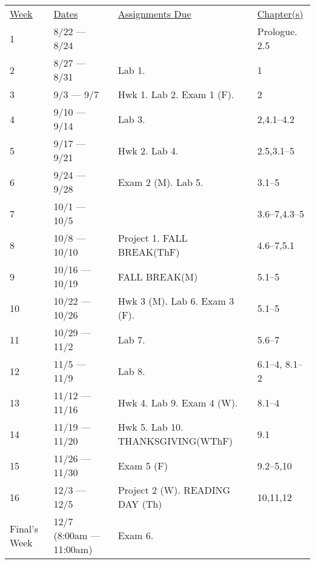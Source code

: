 \documentclass[10pt]{article}
\begin{document}
\begin{center}
\begin{tabular}{llll}
\underline{Week} & \underline{Dates} & \underline{Assignments Due} & \underline{Chapter(s)}\\
1 & 8/22 --- 8/24 &  &  Prologue. 2.5\\
2 & 8/27 --- 8/31 & Lab 1. &  1 \\
3 & 9/3 --- 9/7 & Hwk 1. Lab 2. Exam 1 (F).  &  2 \\
4 & 9/10 --- 9/14 & Lab 3. & 2,4.1--4.2 \\
5 & 9/17 --- 9/21 & Hwk 2. Lab 4. & 2.5,3.1--5\\
6 & 9/24 --- 9/28 & Exam 2 (M). Lab 5. & 3.1--5\\
7 & 10/1 --- 10/5 & & 3.6--7,4.3--5  \\
8 & 10/8 --- 10/10 & Project 1. FALL BREAK(ThF) & 4.6--7,5.1 \\
9 & 10/16 --- 10/19 & FALL BREAK(M)  & 5.1--5 \\
10 & 10/22 --- 10/26 & Hwk 3 (M). Lab 6. Exam 3 (F). & 5.1--5 \\
11 & 10/29 --- 11/2 &  Lab 7. & 5.6--7 \\
12 & 11/5 --- 11/9 &  Lab 8. & 6.1--4, 8.1--2 \\
13 & 11/12 --- 11/16 & Hwk 4. Lab 9. Exam 4 (W). & 8.1--4  \\
14 & 11/19 --- 11/20 & Hwk 5. Lab 10. THANKSGIVING(WThF) & 9.1 \\
15 & 11/26 --- 11/30 & Exam 5 (F)  & 9.2--5,10 \\
16 & 12/3 --- 12/5 & Project 2 (W). READING DAY (Th) & 10,11,12 \\
Final's Week & 12/7 (8:00am --- 11:00am) & Exam 6.  &  \\
\end{tabular}
\end{center}
\end{document}

